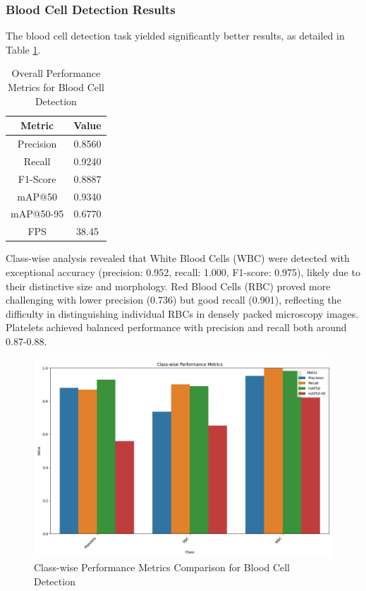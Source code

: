 \begin{multicols}{2}
\subsubsection{Blood Cell Detection Results}

The blood cell detection task yielded significantly better results, as detailed in Table \ref{tab:blood_cell_results}.

\begin{table}[h]
\centering
\begin{tabular}{|c|c|}
\hline
\textbf{Metric} & \textbf{Value} \\
\hline
Precision & 0.8560 \\
Recall & 0.9240 \\
F1-Score & 0.8887 \\
mAP@50 & 0.9340 \\
mAP@50-95 & 0.6770 \\
FPS & 38.45 \\
\hline
\end{tabular}
\caption{Overall Performance Metrics for Blood Cell Detection}
\label{tab:blood_cell_results}
\end{table}

Class-wise analysis revealed that White Blood Cells (WBC) were detected with exceptional accuracy (precision: 0.952, recall: 1.000, F1-score: 0.975), likely due to their distinctive size and morphology. Red Blood Cells (RBC) proved more challenging with lower precision (0.736) but good recall (0.901), reflecting the difficulty in distinguishing individual RBCs in densely packed microscopy images. Platelets achieved balanced performance with precision and recall both around 0.87-0.88.

\begin{figure}[h]
\centering
\includegraphics[width=0.9\columnwidth]{../datas/blood_cell_summary_datas/blood_cells_class_metrics.png}
\caption{Class-wise Performance Metrics Comparison for Blood Cell Detection}
\label{fig:blood_cell_class_metrics}
\end{figure}


\end{multicols}
